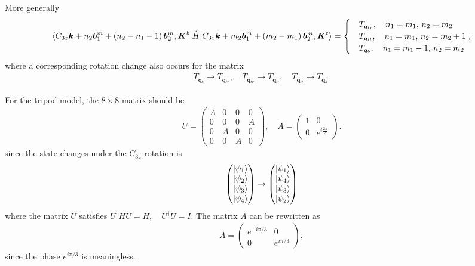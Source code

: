 \documentclass[10pt, oneside]{article}
\newcommand{\p}[1]{\left(#1\right)}
\begin{document}
More generally
\begin{align}
	\braket{C_{3 z} \bm{k} + n_{2} \bm{b}^{m}_{1} + \p{n_{2} - n_{1} -1} \bm{b}^{m}_{2}, \bm{K}^{b}|\hat{H} |C_{3 z} \bm{k}+  m_{2} \bm{b}^{m}_{1} + \p{m_{2} - m_{1}} \bm{b}^{m}_{2}, \bm{K}^{t} } =  \begin{cases}
		&T_{\bm{q}_{tr}} ,\quad n_1 = m_1,\, n_2 = m_2 \\
		&T_{\bm{q}_{tl}}, \quad n_1 = m_1,\, n_2 = m_2 +1 \\
		&T_{\bm{q}_{b}}, \quad n_1 = m_1-1,\, n_2 = m_2
	\end{cases},
\end{align}
where a corresponding rotation change also occurs for the matrix
\begin{align}
	T_{\bm{q}_{b}} \rightarrow T_{\bm{q}_{tr}}, \quad T_{\bm{q}_{tr}} \rightarrow T_{\bm{q}_{tl}}, \quad T_{\bm{q}_{tl}} \rightarrow T_{\bm{q}_{b}}.
\end{align}

For the tripod model, the \(8 \times 8\) matrix should be
\begin{align}
	U = 
	\begin{pmatrix}
		A & 0 & 0 & 0 \\
		0 & 0 & 0 & A \\
		0 & A & 0 & 0 \\
		0 & 0 & A & 0
	\end{pmatrix}, \quad A = \begin{pmatrix}
		1 & 0 \\
		0 & e^{i\frac{2 \pi}{3}}
	\end{pmatrix}.
\end{align}
since the state changes under the \(C_{3z}\) rotation is
\begin{align}
	\begin{pmatrix}
		\ket{\psi_{1}} \\ \ket{\psi_{2}} \\ \ket{\psi_{3}} \\ \ket{\psi_{4}} 
	\end{pmatrix} \rightarrow \begin{pmatrix}
		\ket{\psi_{1}} \\ \ket{\psi_{4}} \\ \ket{\psi_{3}} \\ \ket{\psi_{2}} 
	\end{pmatrix} 
\end{align}
where the matrix \(U\) satisfies \(U^{\dagger} H U = H,\quad U^\dagger U = I\). The matrix \(A\) can be rewritten as 
\begin{align}
	A  = \begin{pmatrix}
		e^{-i \pi/3} & 0 \\
		0 & e^{i \pi/3}
	\end{pmatrix},
\end{align}
since the phase \(e^{i \pi/3}\)  is meaningless.
\end{document}
